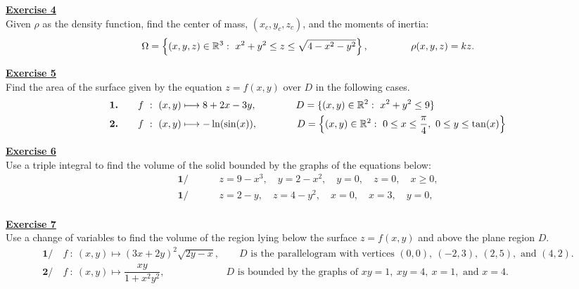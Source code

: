 \noindent\Large{\underline{\textbf{Exercise 4}}}
\normalsize{}\\
\noindent Given $\rho$ as the density function, find the center of mass, $(x_c, y_c, z_c)$, and the moments of inertia:
    $$\Omega = \left\{(x,y,z)\in\mathbb{R}^3:\ x^2 + y^2 \leq z \leq \sqrt{4 - x^2 - y^2}\right\},\ \qquad \qquad \rho(x,y,z) = kz.$$

\noindent\Large{\underline{\textbf{Exercise 5}}}
\normalsize{}\\
\noindent Find the area of the surface given by the equation $z = f(x, y)$ over $D$ in the following cases.
\begin{align*}
    \textbf{1.}& \qquad f\ :\ (x, y) \longmapsto 8 + 2x - 3y, \qquad \qquad D = \{(x, y)\in \R^2:\ x^2 + y^2 \leq 9\}\\
    \textbf{2.}& \qquad f\ :\ (x, y) \longmapsto -\ln(\sin(x)), \qquad \qquad D = \left\{(x, y)\in \R^2:\ 
                                                                  0 \leq x \leq \frac{\pi}{4},\ 0 \leq y \leq \tan (x)\right\}
\end{align*}

\vspace*{0.34cm}
\noindent\Large{\underline{\textbf{Exercise 6}}}
\normalsize{}\\
\noindent Use a triple integral to find the volume of the solid bounded by the graphs of the equations below:
\begin{align*}
    \textbf{1/ }& \qquad z = 9 - x^3,\quad y = 2 - x^2,\quad y = 0,\quad z = 0,\quad x \geq 0,\\
    \textbf{1/ }& \qquad z = 2 - y,\quad z = 4 - y^2,\quad x = 0,\quad x = 3,\quad y = 0,\\
\end{align*}

\pagebreak
\vspace*{0.34cm}
\noindent\Large{\underline{\textbf{Exercise 7}}}
\normalsize{}\\
\noindent Use a change of variables to find the volume of the region lying below the surface $z = f (x, y)$ and above the plane region $D$.
\begin{align*}
    \textbf{1/}& \ f\ :\ (x, y) \longmapsto (3x + 2y)^2 \sqrt{2y -x}, \qquad \text{$D$ is the parallelogram with vertices
                                                                $(0, 0),\ (-2, 3),\ (2, 5),$ and $(4, 2)$.}\\
    \textbf{2/}& \ f\ :\ (x, y) \longmapsto \dfrac{xy}{1 + x^2y^2}, \qquad \qquad \qquad \ \text{$D$ is bounded by the graphs of $xy = 1,\ xy = 4,\ x = 1,$ and $x = 4$.}
\end{align*}
\vspace*{0.34cm}

